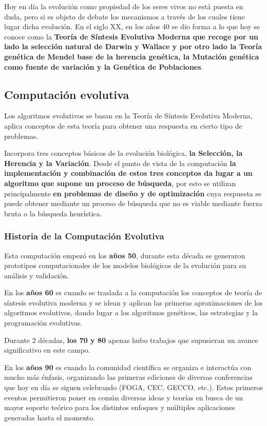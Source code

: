 \documentclass[12pt, twoside, openright]{report} %
\begin{document}
Hoy en día la evolución como propiedad de los seres vivos no está puesta en duda, pero si es objeto de debate los mecanismos a través de los cuales tiene lugar dicha evolución. En el siglo XX, en los años 40 se dio forma a lo que hoy se conoce como la \textbf{Teoría de Síntesis Evolutiva Moderna que recoge por un lado la selección natural de Darwin y Wallace y por otro lado la Teoría genética de Mendel base de la herencia genética, la Mutación genética como fuente de variación y la Genética de Poblaciones}.

\subsection{Computación evolutiva}
Los algoritmos evolutivos se basan en la Teoría de Síntesis Evolutiva Moderna, aplica conceptos de esta teoría para obtener una respuesta en cierto tipo de problemas. 

Incorpora tres conceptos básicos de la evolución biológica, \textbf{la Selección, la Herencia y la Variación}. Desde el punto de vista de la computación \textbf{la implementación y combinación de estos tres conceptos da lugar a un algoritmo que supone un proceso de búsqueda}, por esto se utilizan principalmente \textbf{en problemas de diseño y de optimización} cuya respuesta se puede obtener mediante un proceso de búsqueda que no es viable mediante fuerza bruta o la búsqueda heurística.

\subsubsection{Historia de la Computación Evolutiva}
Esta computación empezó en los \textbf{años 50}, durante esta década se generaron prototipos computacionales de los modelos biológicos de la evolución para su análisis y validación.

En los \textbf{años 60} es cuando se traslada a la computación los conceptos de teoría de síntesis evolutiva moderna y se idean y aplican las primeras aproximaciones de los algoritmos evolutivos, dando lugar a los algoritmos genéticos, las estrategias y la programación evolutivas.

Durante 2 décadas, \textbf{los 70 y 80} apenas hubo trabajos que supusieran un avance significativo en este campo.

En los \textbf{años 90} es cuando la comunidad científica se organiza e interactúa con mucho más énfasis, organizando las primeras ediciones de diversas conferencias que hoy en día se siguen celebrando (FOGA, CEC, GECCO, etc.). Estos primeros eventos permitieron poner en común diversas ideas y teorías en busca de un mayor soporte teórico para los distintos enfoques y múltiples aplicaciones generadas hasta el momento.
\end{document}
